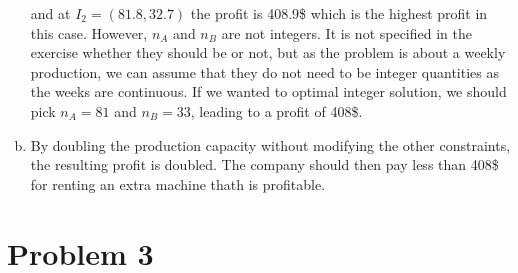 \documentclass[a4paper, 10pt, twoside]{article}
\begin{document}
\begin{enumerate}[a)]
          and at $I_2 = (81.8, 32.7)$ the profit is 408.9\$ which is the highest profit in this case. However, $n_A$ and $n_B$ are not integers. It is not specified in the exercise whether they should be or not, but as the problem is about a weekly production, we can assume that they do not need to be integer quantities as the weeks are continuous. If we wanted to optimal integer solution, we should pick $n_A = 81$ and $n_B = 33$, leading to a profit of 408\$.

        \item By doubling the production capacity without modifying the other constraints, the resulting profit is doubled. The company should then pay less than 408\$ for renting an extra machine thath is profitable.
\end{enumerate}

\section*{Problem 3}
\end{document}
